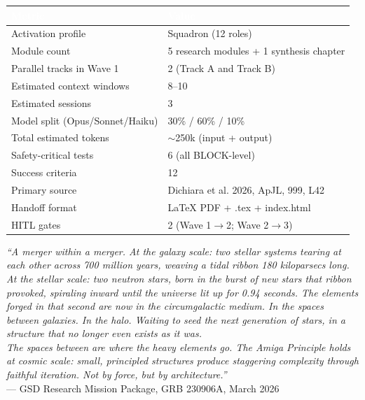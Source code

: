 \documentclass[11pt,letterpaper]{article}
\newcommand{\tableheader}[1]{\textbf{\sffamily\textcolor{white}{#1}}}
\begin{document}
\begin{center}
\begin{tabularx}{\textwidth}{L{4.5cm}X}
\toprule
{}
\tableheader{Metric} & \tableheader{Value} \\
\midrule
Activation profile & Squadron (12 roles) \\
Module count & 5 research modules + 1 synthesis chapter \\
Parallel tracks in Wave 1 & 2 (Track A and Track B) \\
Estimated context windows & 8--10 \\
Estimated sessions & 3 \\
Model split (Opus/Sonnet/Haiku) & 30\% / 60\% / 10\% \\
Total estimated tokens & $\sim$250k (input + output) \\
Safety-critical tests & 6 (all BLOCK-level) \\
Success criteria & 12 \\
Primary source & Dichiara et al. 2026, ApJL, 999, L42 \\
Handoff format & LaTeX PDF + .tex + index.html \\
HITL gates & 2 (Wave 1$\to$2; Wave 2$\to$3) \\
\bottomrule
\end{tabularx}
\end{center}

\vspace{2em}
\begin{quotebox}
\textit{``A merger within a merger. At the galaxy scale: two stellar systems tearing at each other across 700 million years, weaving a tidal ribbon 180 kiloparsecs long. At the stellar scale: two neutron stars, born in the burst of new stars that ribbon provoked, spiraling inward until the universe lit up for 0.94 seconds. The elements forged in that second are now in the circumgalactic medium. In the spaces between galaxies. In the halo. Waiting to seed the next generation of stars, in a structure that no longer even exists as it was.}\\[0.8em]
\textit{The spaces between are where the heavy elements go. The Amiga Principle holds at cosmic scale: small, principled structures produce staggering complexity through faithful iteration. Not by force, but by architecture.''}\\[0.5em]
{\small\sffamily\textcolor{subtlegray}{--- GSD Research Mission Package, GRB 230906A, March 2026}}
\end{quotebox}
\end{document}

